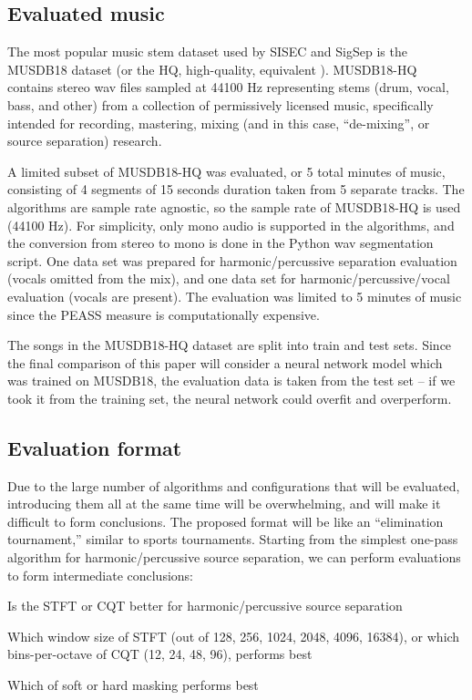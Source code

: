 \documentclass[letter,12pt]{article}
\newenvironment{tight_itemize}{
\begin{itemize}
  \setlength{\itemsep}{0pt}
  \setlength{\parskip}{0pt}
}{\end{itemize}}
\begin{document}
\subsection{Evaluated music}

The most popular music stem dataset used by SISEC and SigSep is the MUSDB18 dataset \cite{musdb18} (or the HQ, high-quality, equivalent \cite{musdb18-hq}). MUSDB18-HQ contains stereo wav files sampled at 44100 Hz representing stems (drum, vocal, bass, and other) from a collection of permissively licensed music, specifically intended for recording, mastering, mixing (and in this case, ``de-mixing'', or source separation) research. 

A limited subset of MUSDB18-HQ was evaluated, or 5 total minutes of music, consisting of 4 segments of 15 seconds duration taken from 5 separate tracks. The algorithms are sample rate agnostic, so the sample rate of MUSDB18-HQ is used (44100 Hz). For simplicity, only mono audio is supported in the algorithms, and the conversion from stereo to mono is done in the Python wav segmentation script. One data set was prepared for harmonic/percussive separation evaluation (vocals omitted from the mix), and one data set for harmonic/percussive/vocal evaluation (vocals are present). The evaluation was limited to 5 minutes of music since the PEASS measure is computationally expensive.

The songs in the MUSDB18-HQ dataset are split into train and test sets. Since the final comparison of this paper will consider a neural network model which was trained on MUSDB18, the evaluation data is taken from the test set -- if we took it from the training set, the neural network could overfit and overperform.

\subsection{Evaluation format}

Due to the large number of algorithms and configurations that will be evaluated, introducing them all at the same time will be overwhelming, and will make it difficult to form conclusions. The proposed format will be like an ``elimination tournament,'' similar to sports tournaments. Starting from the simplest one-pass algorithm for harmonic/percussive source separation, we can perform evaluations to form intermediate conclusions:

\begin{tight_itemize}
\item
	Is the STFT or CQT better for harmonic/percussive source separation
\item
	Which window size of STFT (out of 128, 256, 1024, 2048, 4096, 16384), or which bins-per-octave of CQT (12, 24, 48, 96), performs best
\item
	Which of soft or hard masking performs best
\end{tight_itemize} 
\end{document}

